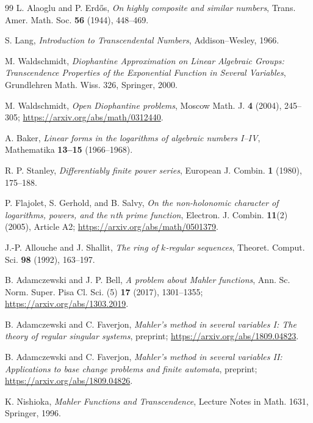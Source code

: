 \documentclass[11pt]{article}
\numberwithin{equation}{section}
\theoremstyle{definition}
\theoremstyle{remark}
\begin{document}
\begin{thebibliography}{99}
L. Alaoglu and P. Erd\H{o}s,
\emph{On highly composite and similar numbers},
Trans. Amer. Math. Soc. \textbf{56} (1944), 448--469.

S. Lang,
\emph{Introduction to Transcendental Numbers},
Addison--Wesley, 1966.

M. Waldschmidt,
\emph{Diophantine Approximation on Linear Algebraic Groups: Transcendence Properties of the Exponential Function in Several Variables},
Grundlehren Math. Wiss. 326, Springer, 2000.

M. Waldschmidt,
\emph{Open Diophantine problems},
Moscow Math. J. \textbf{4} (2004), 245--305;
\url{https://arxiv.org/abs/math/0312440}.

A. Baker,
\emph{Linear forms in the logarithms of algebraic numbers I--IV},
Mathematika \textbf{13--15} (1966--1968).

R. P. Stanley,
\emph{Differentiably finite power series},
European J. Combin. \textbf{1} (1980), 175--188.

P. Flajolet, S. Gerhold, and B. Salvy,
\emph{On the non-holonomic character of logarithms, powers, and the $n$th prime function},
Electron. J. Combin. \textbf{11}(2) (2005), Article A2;
\url{https://arxiv.org/abs/math/0501379}.

J.-P. Allouche and J. Shallit,
\emph{The ring of $k$-regular sequences},
Theoret. Comput. Sci. \textbf{98} (1992), 163--197.

B. Adamczewski and J. P. Bell,
\emph{A problem about Mahler functions},
Ann. Sc. Norm. Super. Pisa Cl. Sci. (5) \textbf{17} (2017), 1301--1355;
\url{https://arxiv.org/abs/1303.2019}.

B. Adamczewski and C. Faverjon,
\emph{Mahler's method in several variables I: The theory of regular singular systems},
preprint;
\url{https://arxiv.org/abs/1809.04823}.

B. Adamczewski and C. Faverjon,
\emph{Mahler's method in several variables II: Applications to base change problems and finite automata},
preprint;
\url{https://arxiv.org/abs/1809.04826}.

K. Nishioka,
\emph{Mahler Functions and Transcendence},
Lecture Notes in Math. 1631, Springer, 1996.


\end{thebibliography}
\end{document}

